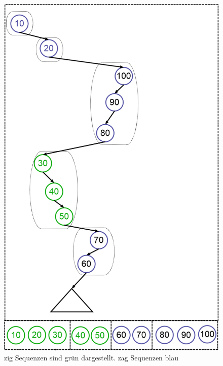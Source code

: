\documentclass[a4paper,12pt]{article}
\begin{document}
\begin{figure}[h]
	\centering
	\includegraphics[height= 0.7\textwidth]{"Medien/Zipper/preferredPathZigZag"}
	\caption{zig Sequenzen sind grün dargestellt. zag Sequenzen blau }
	\label{fig:preferredPathZigZag}
\end{figure}
\newpage


\end{document}
